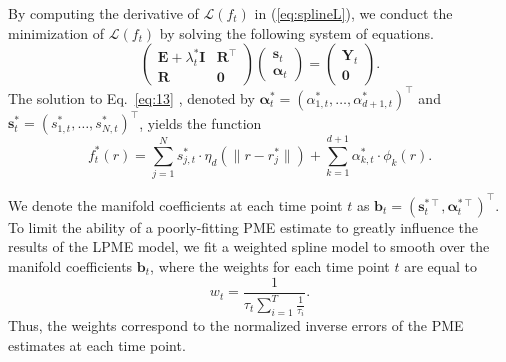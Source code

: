 \documentclass[11pt,reqno]{article}
\newcommand{\T}{\intercal}
\theoremstyle{definition}
\begin{document}
By computing the derivative of $\mathcal{L}(f_t)$ in (\ref{eq:splineL}), we conduct the minimization of $\mathcal{L}(f_t)$ by solving the following system of equations.
\begin{equation}
  \left(
    \begin{array}{cc}
      \mathbf{E} + \lambda_t^* \mathbf{I} & \mathbf{R}^\T \\
      \mathbf{R} & \mathbf{0}
    \end{array}
  \right)\left(
    \begin{array}{c}
      \mathbf{s}_t \\
      \mathbf{\alpha}_t
    \end{array}
  \right) = \left(
    \begin{array}{c}
      \mathbf{Y}_t \\
      \mathbf{0}
    \end{array}
  \right). \label{eq:13}
\end{equation}
The solution to Eq.~\eqref{eq:13} , denoted by $\mathbf{\alpha}^*_t=(\alpha^*_{1,t},\ldots,\alpha^*_{d+1,t})^\T$ and $\mathbf{s}^*_t=(s^*_{1,t},\ldots,s^*_{N,t})^\T$, yields the function
\begin{equation}\nonumber
  f_t^*(r) = \sum_{j=1}^{N}s_{j,t}^* \cdot  \eta_{d}\left(\|r - r_j^*\|\right) + \sum_{k=1}^{d + 1}\alpha_{k,t}^* \cdot \phi_k(r).
\end{equation}

We denote the manifold coefficients at each time point $t$ as $\mathbf{b}_t = (\mathbf{s}_t^{*\T}, \mathbf{\alpha}_t^{*\T})^\T$. To limit the ability of a poorly-fitting PME estimate to greatly influence the results of the LPME model, we fit a weighted spline model to smooth over the manifold coefficients $\mathbf{b}_t$, where the weights for each time point $t$ are equal to
$$w_t = \frac{1}{\tau_t\sum_{i=1}^{T}\frac{1}{\tau_i}}.$$ Thus, the weights correspond to the normalized inverse errors of the PME estimates at each time point.
\end{document}
